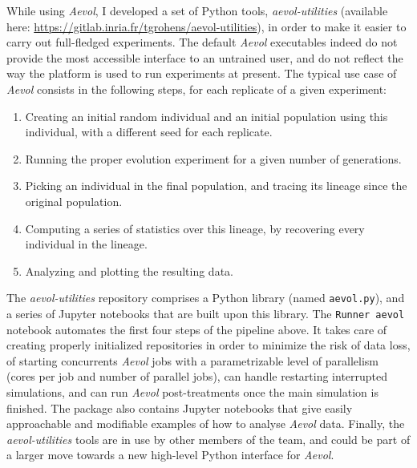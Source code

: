 While using \emph{Aevol}, I developed a set of Python tools, \emph{aevol-utilities} (available here: \url{https://gitlab.inria.fr/tgrohens/aevol-utilities}), in order to make it easier to carry out full-fledged experiments.
The default \emph{Aevol} executables indeed do not provide the most accessible interface to an untrained user, and do not reflect the way the platform is used to run experiments at present.
The typical use case of \emph{Aevol} consists in the following steps, for each replicate of a given experiment:
\begin{enumerate}
\item Creating an initial random individual and an initial population using this individual, with a different seed for each replicate.
\item Running the proper evolution experiment for a given number of generations.
\item Picking an individual in the final population, and tracing its lineage since the original population.
\item Computing a series of statistics over this lineage, by recovering every individual in the lineage.
\item Analyzing and plotting the resulting data.
\end{enumerate}

The \emph{aevol-utilities} repository comprises a Python library (named \texttt{aevol.py}), and a series of Jupyter notebooks that are built upon this library.
The \texttt{Runner aevol} notebook automates the first four steps of the pipeline above.
It takes care of creating properly initialized repositories in order to minimize the risk of data loss, of starting concurrents \emph{Aevol} jobs with a parametrizable level of parallelism (cores per job and number of parallel jobs), can handle restarting interrupted simulations, and can run \emph{Aevol} post-treatments once the main simulation is finished.
The package also contains Jupyter notebooks that give easily approachable and modifiable examples of how to analyse \emph{Aevol} data.
Finally, the \emph{aevol-utilities} tools are in use by other members of the team, and could be part of a larger move towards a new high-level Python interface for \emph{Aevol}.




